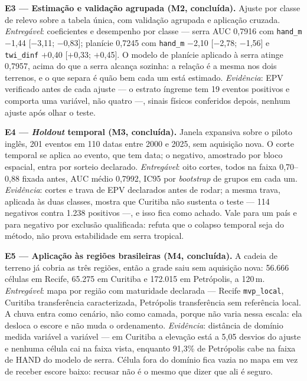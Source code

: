 \documentclass[conference]{IEEEtran}
\begin{document}
\textbf{E3 --- Estimação e validação agrupada (M2, concluída).} Ajuste por classe
de relevo sobre a tabela única, com validação agrupada e aplicação cruzada.
\emph{Entregável}: coeficientes e desempenho por classe --- serra AUC 0,7916 com
\texttt{hand\_m} $-$1,44 [$-$3,11; $-$0,83]; planície 0,7245 com \texttt{hand\_m}
$-$2,10 [$-$2,78; $-$1,56] e \texttt{twi\_dinf} $+$0,40 [$+$0,33; $+$0,45]. O
modelo de planície aplicado à serra atinge 0,7957, acima do que a serra alcança
sozinha: a relação é a mesma nos dois terrenos, e o que separa é quão bem cada um
está estimado. \emph{Evidência}: EPV verificado antes de cada ajuste --- o
estrato íngreme tem 19 eventos positivos e comporta uma variável, não quatro ---,
sinais físicos conferidos depois, nenhum ajuste após olhar o teste.

\textbf{E4 --- \emph{Holdout} temporal (M3, concluída).} Janela expansiva sobre o
piloto inglês, 201 eventos em 110 datas entre 2000 e 2025, sem aquisição nova. O
corte temporal se aplica ao evento, que tem data; o negativo, amostrado por bloco
espacial, entra por sorteio declarado. \emph{Entregável}: oito cortes, todos na
faixa 0,70--0,88 fixada antes, AUC médio 0,7992, IC95 por \emph{bootstrap} de
grupos em cada um. \emph{Evidência}: cortes e trava de EPV declarados antes de
rodar; a mesma trava, aplicada às duas classes, mostra que Curitiba não sustenta
o teste --- 114 negativos contra 1.238 positivos ---, e isso fica como achado.
Vale para um país e para negativo por exclusão qualificada: refuta que o colapso
temporal seja do método, não prova estabilidade em serra tropical.

\textbf{E5 --- Aplicação às regiões brasileiras (M4, concluída).} A cadeia de
terreno já cobria as três regiões, então a grade saiu sem aquisição nova: 56.666
células em Recife, 65.275 em Curitiba e 172.015 em Petrópolis, a 120\,m.
\emph{Entregável}: mapa por região com maturidade declarada --- Recife
\texttt{mvp\_local}, Curitiba transferência caracterizada, Petrópolis
transferência sem referência local. A chuva entra como cenário, não como camada,
porque não varia nessa escala: ela desloca o escore e não muda o ordenamento.
\emph{Evidência}: distância de domínio medida variável a variável --- em
Curitiba a elevação está a 5,05 desvios do ajuste e nenhuma célula cai na faixa
vista, enquanto 91,3\% de Petrópolis cabe na faixa de HAND do modelo de serra.
Célula fora do domínio fica vazia no mapa em vez de receber escore baixo:
recusar não é o mesmo que dizer que ali é seguro.
\end{document}
